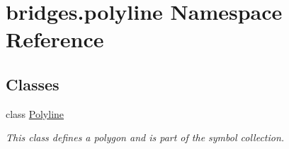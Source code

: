 \hypertarget{namespacebridges_1_1polyline}{}\section{bridges.\+polyline Namespace Reference}
\label{namespacebridges_1_1polyline}
\subsection*{Classes}
\begin{DoxyCompactItemize}
\item 
class \hyperlink{classbridges_1_1polyline_1_1_polyline}{Polyline}
\begin{DoxyCompactList}\small\item\em This class defines a polygon and is part of the symbol collection. \end{DoxyCompactList}\end{DoxyCompactItemize}
